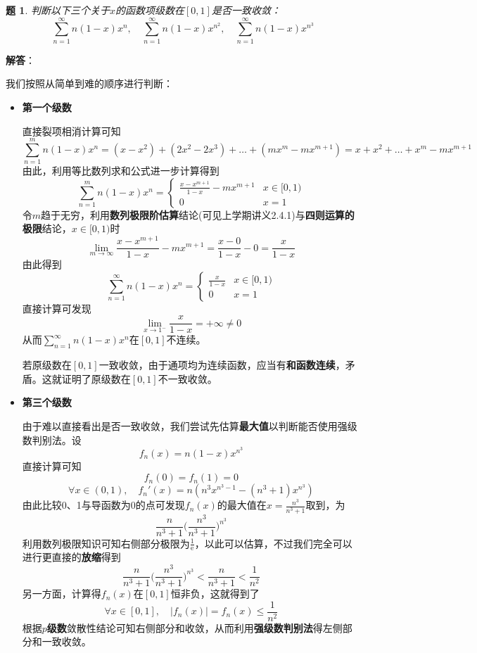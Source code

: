 \documentclass[a4paper,UTF8,fontset=windows,AutoFakeBold]{ctexart}
\newcommand*{\er}{\mathrm{e}}
\newcommand*{\suminf}[1][n=1]{\sum_{#1}^\infty}
\theoremstyle{ex}
\newtheorem{exercise}{题}
\newcommand{\sol}[1]{{\vspace{5pt}\kaishu\noindent\textbf{解答}：\vspace{-3pt}
\begin{compactitem}
    \item[] #1
\end{compactitem}
}}
\begin{document}
\begin{framed}
\begin{exercise}
    判断以下三个关于$x$的函数项级数在$[0,1]$是否一致收敛：
    $$\suminf n(1-x)x^n,\quad\suminf n(1-x)x^{n^2},\quad\suminf n(1-x)x^{n^3}$$
\end{exercise}
\sol{
    我们按照从简单到难的顺序进行判断：
    \begin{itemize}
        \item \textbf{第一个级数}
        
        直接裂项相消计算可知
        $$\sum_{n=1}^mn(1-x)x^n=(x-x^2)+(2x^2-2x^3)+\dots+(mx^m-mx^{m+1})=x+x^2+\dots+x^m-mx^{m+1}$$
        由此，利用等比数列求和公式进一步计算得到
        $$\sum_{n=1}^mn(1-x)x^n=\begin{cases}\frac{x-x^{m+1}}{1-x}-mx^{m+1}&x\in[0,1)\\0&x=1\end{cases}$$
        令$m$趋于无穷，利用\textbf{数列极限阶估算}结论(可见上学期讲义2.4.1)与\textbf{四则运算的极限}结论，$x\in[0,1)$时
        $$\lim_{m\to\infty}\frac{x-x^{m+1}}{1-x}-mx^{m+1}=\frac{x-0}{1-x}-0=\frac{x}{1-x}$$
        由此得到
        $$\suminf n(1-x)x^n=\begin{cases}\frac{x}{1-x}&x\in[0,1)\\0&x=1\end{cases}$$
        直接计算可发现
        $$\lim_{x\to1^-}\frac{x}{1-x}=+\infty\ne0$$
        从而$\suminf n(1-x)x^n$在$[0,1]$不连续。
        
        若原级数在$[0,1]$一致收敛，由于通项均为连续函数，应当有\textbf{和函数连续}，矛盾。这就证明了原级数在$[0,1]$不一致收敛。

        \item \textbf{第三个级数}
        
        由于难以直接看出是否一致收敛，我们尝试先估算\textbf{最大值}以判断能否使用强级数判别法。设
        $$f_n(x)=n(1-x)x^{n^3}$$
        直接计算可知
        $$f_n(0)=f_n(1)=0$$
        $$\forall x\in(0,1),\quad f_n'(x)=n(n^3x^{n^3-1}-(n^3+1)x^{n^3})$$
        由此比较0、1与导函数为0的点可发现$f_n(x)$的最大值在$x=\frac{n^3}{n^3+1}$取到，为
        $$\frac{n}{n^3+1}\bigg(\frac{n^3}{n^3+1}\bigg)^{n^3}$$
        利用数列极限知识可知右侧部分极限为$\frac{1}{\er}$，以此可以估算，不过我们完全可以进行更直接的\textbf{放缩}得到
        $$\frac{n}{n^3+1}\bigg(\frac{n^3}{n^3+1}\bigg)^{n^3}<\frac{n}{n^3+1}<\frac{1}{n^2}$$
        另一方面，计算得$f_n(x)$在$[0,1]$恒非负，这就得到了
        $$\forall x\in[0,1],\quad |f_n(x)|=f_n(x)\le\frac{1}{n^2}$$
        根据\textbf{$p$级数}敛散性结论可知右侧部分和收敛，从而利用\textbf{强级数判别法}得左侧部分和一致收敛。
        

\end{itemize}}
\end{framed}
\end{document}
